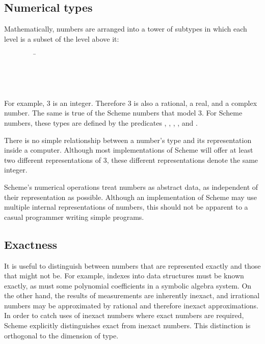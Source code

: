 \subsection{Numerical types}
\label{numericaltypes}

\vest Mathematically, numbers are arranged into a tower of subtypes
in which each level is a subset of the level above it:
\begin{tabbing}
\ \ \ \ \ \ \ \ \ \= \\
\>  \\
\>  \\
\>  \\
\>  
\end{tabbing}

For example, 3 is an integer.  Therefore 3 is also a rational,
a real, and a complex number.  The same is true of the Scheme numbers
that model 3.  For Scheme numbers, these types are defined by the
predicates , , , ,
and .

There is no simple relationship between a number's type and its
representation inside a computer.  Although most implementations of
Scheme will offer at least two different representations of 3, these
different representations denote the same integer.

Scheme's numerical operations treat numbers as abstract data, as
independent of their representation as possible.  Although an implementation
of Scheme may use multiple internal representations of
numbers, this should not be apparent to a casual programmer writing
simple programs.

\subsection{Exactness}

 \label{exactly}

It is useful to distinguish between numbers that are
represented exactly and those that might not be.  For example, indexes
into data structures must be known exactly, as must some polynomial
coefficients in a symbolic algebra system.  On the other hand, the
results of measurements are inherently inexact, and irrational numbers
may be approximated by rational and therefore inexact approximations.
In order to catch uses of inexact numbers where exact numbers are
required, Scheme explicitly distinguishes exact from inexact numbers.
This distinction is orthogonal to the dimension of type.

